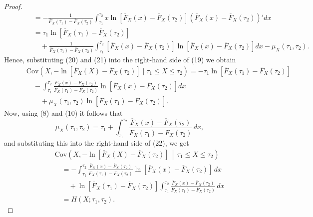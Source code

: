 \documentclass[11pt]{article}
\begin{document}
\begin{proof}
\begin{align}
		& \textstyle \qquad \quad = -\frac{1}{\overline{F}_X(\tau_1)-\overline{F}_X(\tau_2)} \int_{\tau_1}^{\tau_2} x \ln[\overline{F}_X(x)-\overline{F}_X(\tau_2)] (\overline{F}_X(x)-\overline{F}_X(\tau_2))' dx \nonumber \\
		& \textstyle \qquad \quad = \tau_1 \ln[\overline{F}_X(\tau_1)-\overline{F}_X(\tau_2)] \nonumber \\
		& \textstyle \qquad \qquad + \frac{1}{\overline{F}_X(\tau_1)-\overline{F}_X(\tau_2)} \int_{\tau_1}^{\tau_2} [\overline{F}_X(x)-\overline{F}_X(\tau_2)] \ln[\overline{F}_X(x)-\overline{F}_X(\tau_2)] dx - \mu_X(\tau_1,\tau_2).
	\end{align}
	Hence, substituting (20) and (21) into the right-hand side of (19) we obtain
	\begin{align}
		& \textstyle \qquad \mathrm{Cov}\left(X, -\ln[\overline{F}_X(X)-\overline{F}_X(\tau_2)] \mid \tau_1 \leq X \leq \tau_2 \right) = -\tau_1 \ln[\overline{F}_X(\tau_1)-\overline{F}_X(\tau_2)] \nonumber \\
		& \textstyle \qquad \quad - \int_{\tau_1}^{\tau_2} \frac{\overline{F}_X(x)-\overline{F}_X(\tau_2)}{\overline{F}_X(\tau_1)-\overline{F}_X(\tau_2)} \ln[\overline{F}_X(x)-\overline{F}_X(\tau_2)] dx \nonumber \\
		& \textstyle \qquad \qquad + \mu_X(\tau_1,\tau_2) \ln[\overline{F}_X(\tau_1)-\overline{F}_X(\tau_2)]. 
	\end{align}
	Now, using (8) and (10) it follows that
	$$ \textstyle \mu_X(\tau_1, \tau_2) = \tau_1 + \int_{\tau_1}^{\tau_2} \frac{\overline{F}_X(x) - \overline{F}_X(\tau_2)}{\overline{F}_X(\tau_1) - \overline{F}_X(\tau_2)} \, dx, $$
	and substituting this into the right-hand side of (22), we get
	\begin{align*}
		& \textstyle \qquad \mathrm{Cov}\left(X, -\ln\left[\overline{F}_X(X) - \overline{F}_X(\tau_2)\right] \,\middle|\, \tau_1 \leq X \leq \tau_2 \right) \\
		& \textstyle \qquad \quad = -\int_{\tau_1}^{\tau_2} \frac{\overline{F}_X(x) - \overline{F}_X(\tau_2)}{\overline{F}_X(\tau_1) - \overline{F}_X(\tau_2)} \ln\left[\overline{F}_X(x) - \overline{F}_X(\tau_2)\right] \, dx \\
		& \textstyle \qquad \qquad + \ln\left[\overline{F}_X(\tau_1) - \overline{F}_X(\tau_2)\right] \int_{\tau_1}^{\tau_2} \frac{\overline{F}_X(x) - \overline{F}_X(\tau_2)}{\overline{F}_X(\tau_1) - \overline{F}_X(\tau_2)} \, dx \\
		& \textstyle \qquad \quad = H(X; \tau_1, \tau_2).
	\end{align*}
\end{proof}
\end{document}
